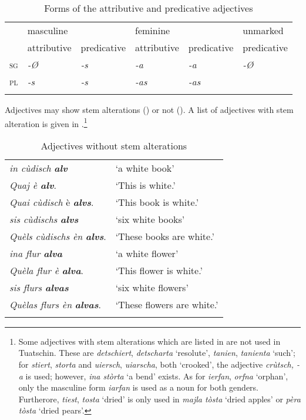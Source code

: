 \begin{table}
	\caption{Forms of the attributive and predicative adjectives}
	\label{tab:adj:attrandpred}
	\begin{tabular}{llllll}
		\lsptoprule
		& masculine && feminine && unmarked \\
		&		attributive & predicative& attributive & predicative & predicative \\
		\midrule
		\textsc{sg} & \textit{-Ø} & \textit{-s} & \textit{-a} & \textit{-a} & \textit{-Ø}\\
		\textsc{pl} & \textit{-s} & \textit{-s} & \textit{-as} & \textit{-as}\\
		\lspbottomrule
	\end{tabular}
\end{table}

Adjectives may show stem alterations  () or not (). A list of adjectives with stem alteration is given in .\footnote{Some adjectives with stem alterations which are listed in \citet[282f.]{Spescha1989} are not used in Tuatschin. These are \textit{detschiert}, \textit{detscharta} `resolute', \textit{tanien}, \textit{tanienta} `such'; for \textit{stiert}, \textit{storta} and \textit{uiersch}, \textit{uiarscha}, both `crooked', the adjective \textit{crùtsch, -a} is used; however, \textit{ina stòrta} `a bend' exists. As for \textit{ierfan}, \textit{orfna} `orphan', only the masculine form \textit{iarfan} is used as a noun for both genders. Furtherore, \textit{tiest}, \textit{tosta} `dried' is only used in \textit{majla tòsta} `dried apples' or \textit{pèra tòsta} `dried pears'.}

\begin{table}
\caption{Adjectives without stem alterations}
\label{tab:adj:nostemalterations}
 \begin{tabular}{ll}
  \lsptoprule
 \textit{in cùdisch} \textbf{\textit{alv}} & `a white book'\\
\textit{Quaj è \textbf{alv}}. & `This is white.'\\
\textit{Quai cùdisch} è \textbf{\textit{alvs}}. & `This book is white.'\\
\textit{sis cùdischs} \textbf{\textit{alvs}} & `six white books'\\
\textit{Quèls cùdischs èn} \textbf{\textit{alvs}}. & `These books are white.'\\
\textit{ina flur} \textbf{\textit{alva}} & `a white flower'\\
\textit{Quèla flur è} \textbf{\textit{alva}}. & `This flower is white.'\\
\textit{sis flurs \textbf{alvas}} & `six white flowers'\\
\textit{Quèlas flurs èn} \textbf{\textit{alvas}}. & `These flowers are white.'\\
  \lspbottomrule
 \end{tabular}
\end{table}

